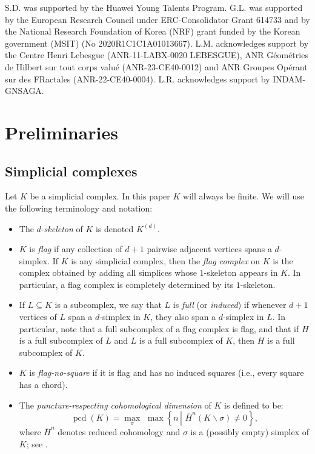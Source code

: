 \documentclass{amsart}
\theoremstyle{plain}
\theoremstyle{definition}
\theoremstyle{remark}
\numberwithin{equation}{section}
\newcommand{\pcd}{\operatorname{pcd}}
\renewcommand{\setminus}{\smallsetminus}
\begin{document}
S.D. was supported by the Huawei Young Talents Program.  G.L. was supported by the European Research Council under ERC-Consolidator Grant 614733 and by the National Research Foundation of Korea (NRF) grant funded by the Korean government (MSIT) (No 2020R1C1C1A01013667). L.M. acknowledges support by the Centre Henri Lebesgue (ANR-11-LABX-0020 LEBESGUE),  ANR G\'eom\'etries de Hilbert sur tout corps valu\'e (ANR-23-CE40-0012) and  ANR Groupes Op\'erant sur des FRactales (ANR-22-CE40-0004). L.R. acknowledges support by INDAM-GNSAGA. 







\section{Preliminaries}

\subsection{Simplicial complexes}
Let $K$ be a  simplicial complex. 
In this paper $K$ will always be finite.
We will use the following terminology and notation:
\begin{itemize}
    \item The $d$-\textit{skeleton} of $K$ is denoted $K^{(d)}$.

    \item $K$ is \textit{flag} if any collection of $d+1$ pairwise adjacent vertices spans a $d$-simplex.
    If $K$ is any simplicial complex, then the \textit{flag complex} on $K$ is the complex obtained by adding all simplices whose $1$-skeleton appears in $K$.
    In particular, a flag complex is completely determined by its $1$-skeleton.

    \item If $L\subseteq K$ is a subcomplex, we say that $L$ is \textit{full} (or \textit{induced}) if 
    whenever $d+1$ vertices of $L$ span a $d$-simplex in $K$, they also span a $d$-simplex in $L$.
    In particular, note that a full subcomplex of a flag complex is flag, and that if $H$ is a full subcomplex of $L$ and $L$ is a full subcomplex of $K$, then $H$ is a full subcomplex of $K$.
    
    \item $K$ is \textit{flag-no-square} if it is flag and has no induced squares (i.e., every square has a chord).
    
    \item The \textit{puncture-respecting cohomological dimension} of $K$ is defined to be: 
$$\pcd(K)=\max_{\sigma} \,\, \max \left\lbrace n \, \left | \,\,   \overline H^n(K\setminus \sigma) \neq 0 \right . \right\rbrace,$$
where $\overline H^n$ denotes reduced cohomology and $\sigma$ is a (possibly empty) simplex of $K$; see \cite{DS21}.
        
\end{itemize}
\end{document}
